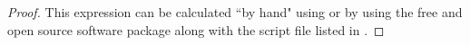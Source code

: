 \begin{proof}
This expression can be calculated ``by hand" using 
or by using the free and open source software package 
along with the script file listed in .
%    
%    
\end{proof}

